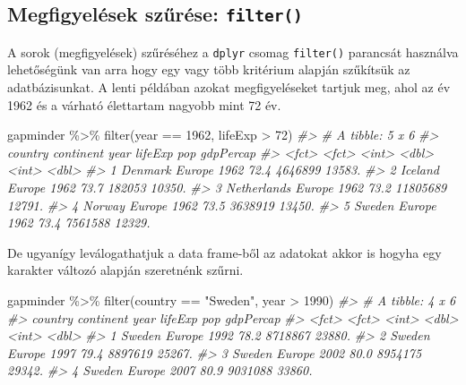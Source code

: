 \documentclass[
]{book}
\newenvironment{Shaded}{\begin{snugshade}}{\end{snugshade}}
\newcommand{\CommentTok}[1]{\textcolor[rgb]{0.56,0.35,0.01}{\textit{#1}}}
\newcommand{\DecValTok}[1]{\textcolor[rgb]{0.00,0.00,0.81}{#1}}
\newcommand{\FunctionTok}[1]{\textcolor[rgb]{0.00,0.00,0.00}{#1}}
\newcommand{\NormalTok}[1]{#1}
\newcommand{\SpecialCharTok}[1]{\textcolor[rgb]{0.00,0.00,0.00}{#1}}
\newcommand{\StringTok}[1]{\textcolor[rgb]{0.31,0.60,0.02}{#1}}
\begin{document}
\hypertarget{megfigyeluxe9sek-szux171ruxe9se-filter}{%
\subsection{\texorpdfstring{Megfigyelések szűrése:
\texttt{filter()}}{Megfigyelések szűrése: filter()}}\label{megfigyeluxe9sek-szux171ruxe9se-filter}}

A sorok (megfigyelések) szűréséhez a \texttt{dplyr} csomag
\texttt{filter()} parancsát használva lehetőségünk van arra hogy egy
vagy több kritérium alapján szűkítsük az adatbázisunkat. A lenti
példában azokat megfigyeléseket tartjuk meg, ahol az év 1962 és a
várható élettartam nagyobb mint 72 év.

\begin{Shaded}
\begin{Highlighting}[]
\NormalTok{gapminder }\SpecialCharTok{\%\textgreater{}\%}
  \FunctionTok{filter}\NormalTok{(year }\SpecialCharTok{==} \DecValTok{1962}\NormalTok{, lifeExp }\SpecialCharTok{\textgreater{}} \DecValTok{72}\NormalTok{)}
\CommentTok{\#\textgreater{} \# A tibble: 5 x 6}
\CommentTok{\#\textgreater{}   country     continent  year lifeExp      pop gdpPercap}
\CommentTok{\#\textgreater{}   \textless{}fct\textgreater{}       \textless{}fct\textgreater{}     \textless{}int\textgreater{}   \textless{}dbl\textgreater{}    \textless{}int\textgreater{}     \textless{}dbl\textgreater{}}
\CommentTok{\#\textgreater{} 1 Denmark     Europe     1962    72.4  4646899    13583.}
\CommentTok{\#\textgreater{} 2 Iceland     Europe     1962    73.7   182053    10350.}
\CommentTok{\#\textgreater{} 3 Netherlands Europe     1962    73.2 11805689    12791.}
\CommentTok{\#\textgreater{} 4 Norway      Europe     1962    73.5  3638919    13450.}
\CommentTok{\#\textgreater{} 5 Sweden      Europe     1962    73.4  7561588    12329.}
\end{Highlighting}
\end{Shaded}

De ugyanígy leválogathatjuk a data frame-ből az adatokat akkor is hogyha
egy karakter változó alapján szeretnénk szűrni.

\begin{Shaded}
\begin{Highlighting}[]
\NormalTok{gapminder }\SpecialCharTok{\%\textgreater{}\%}
  \FunctionTok{filter}\NormalTok{(country }\SpecialCharTok{==} \StringTok{"Sweden"}\NormalTok{, year }\SpecialCharTok{\textgreater{}} \DecValTok{1990}\NormalTok{)}
\CommentTok{\#\textgreater{} \# A tibble: 4 x 6}
\CommentTok{\#\textgreater{}   country continent  year lifeExp     pop gdpPercap}
\CommentTok{\#\textgreater{}   \textless{}fct\textgreater{}   \textless{}fct\textgreater{}     \textless{}int\textgreater{}   \textless{}dbl\textgreater{}   \textless{}int\textgreater{}     \textless{}dbl\textgreater{}}
\CommentTok{\#\textgreater{} 1 Sweden  Europe     1992    78.2 8718867    23880.}
\CommentTok{\#\textgreater{} 2 Sweden  Europe     1997    79.4 8897619    25267.}
\CommentTok{\#\textgreater{} 3 Sweden  Europe     2002    80.0 8954175    29342.}
\CommentTok{\#\textgreater{} 4 Sweden  Europe     2007    80.9 9031088    33860.}
\end{Highlighting}
\end{Shaded}
\end{document}
